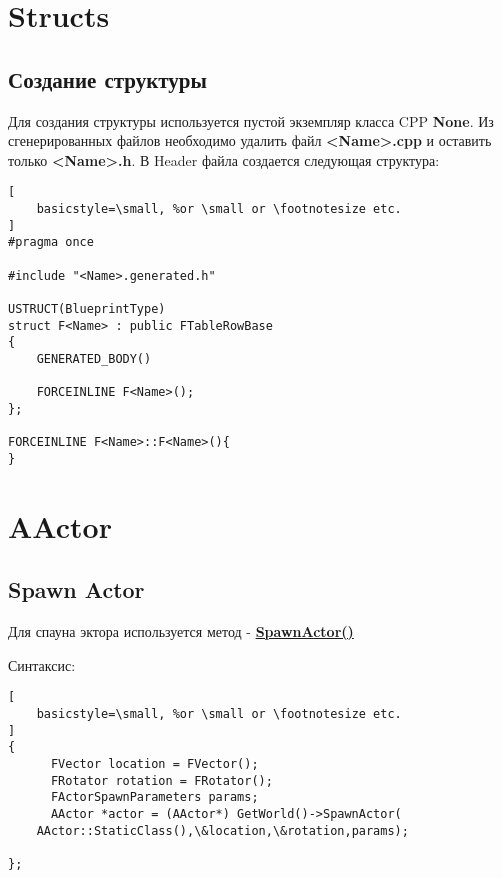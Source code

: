 \documentclass[a4paper,article,14pt]{extarticle}
\begin{document}
\newpage
\section{Structs}
\subsection{Создание структуры}

Для создания структуры используется пустой экземпляр класса CPP \textbf{None}. Из сгенерированных файлов необходимо удалить файл \textbf{<Name>.cpp} и оставить только \textbf{<Name>.h}. В Header файла создается следующая структура:
\\
\lstset{language=C}          
\begin{lstlisting}[
    basicstyle=\small, %or \small or \footnotesize etc.
]              
#pragma once

#include "<Name>.generated.h"

USTRUCT(BlueprintType)
struct F<Name> : public FTableRowBase
{
	GENERATED_BODY()
    
	FORCEINLINE F<Name>();
};

FORCEINLINE F<Name>::F<Name>(){
}
\end{lstlisting}          

\newpage
\section{AActor}
\subsection{Spawn Actor}
Для спауна эктора используется метод - \href{https://docs.unrealengine.com/4.26/en-US/ProgrammingAndScripting/ProgrammingWithCPP/UnrealArchitecture/Actors/Spawning/}{\textbf{SpawnActor()}}

Синтаксис:

\begin{lstlisting}[
    basicstyle=\small, %or \small or \footnotesize etc.
]   
{
      FVector location = FVector();
      FRotator rotation = FRotator();
      FActorSpawnParameters params;
      AActor *actor = (AActor*) GetWorld()->SpawnActor(
	AActor::StaticClass(),\&location,\&rotation,params);
		
};
\end{lstlisting}         
\end{document}
